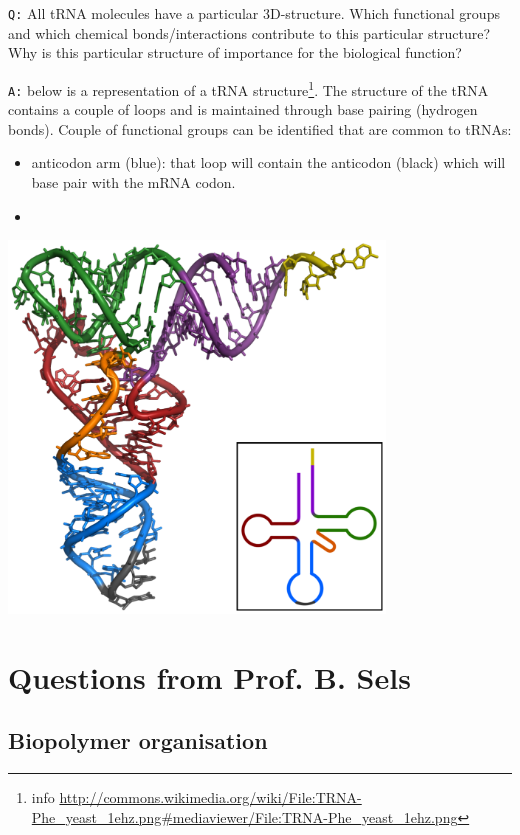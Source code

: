 \documentclass[11pt, a4paper,titlepage]{article}
\begin{document}
\texttt{Q:} All tRNA molecules have a particular 3D-structure. Which
functional groups and which chemical bonds/interactions contribute to
this particular structure? Why is this particular structure of
importance for the biological function?

\texttt{A:} below is a representation of a tRNA structure\footnote{info
\href{http://commons.wikimedia.org/wiki/File:TRNA-Phe_yeast_1ehz.png#mediaviewer/File:TRNA-Phe_yeast_1ehz.png}{http://commons.wikimedia.org/wiki/File:TRNA-Phe\_yeast\_1ehz.png\#mediaviewer/File:TRNA-Phe\_yeast\_1ehz.png}
 }. The
structure of the tRNA contains a couple of loops and is maintained
through base pairing (hydrogen bonds). Couple of functional groups can
be identified that are common to tRNAs:

\begin{itemize}
\item anticodon arm (blue): that loop will contain the anticodon (black)
  which will base pair with the mRNA codon.
\item 
\end{itemize}

\includegraphics[width=10cm]{./Figures/TRNA-Phe_yeast.png}
\section{Questions from Prof. B. Sels}
\label{sec-2}
\subsection{Biopolymer organisation}
\label{sec-2-1}
\end{document}
